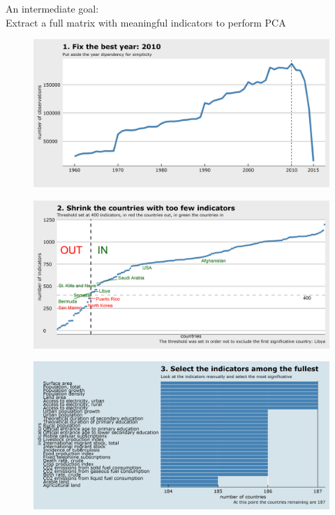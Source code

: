 \documentclass[9pt]{beamer}
\begin{document}
\begin{frame}
\begin{center}
{\Large An intermediate goal:} \\[.2cm]
Extract a full matrix with meaningful indicators to perform PCA
\end{center}
\end{frame}


\begin{frame}
\begin{figure}
\centering
\includegraphics[width=\textwidth]{fix2010.png}
\end{figure}
\end{frame}

\begin{frame}
\begin{figure}
\centering
\includegraphics[width=\textwidth]{plot0005.png}
\end{figure}
\end{frame}

\begin{frame}
\begin{figure}
\centering
\includegraphics[width=\textwidth]{plot0006.png}
\end{figure}
\end{frame}
\end{document}

